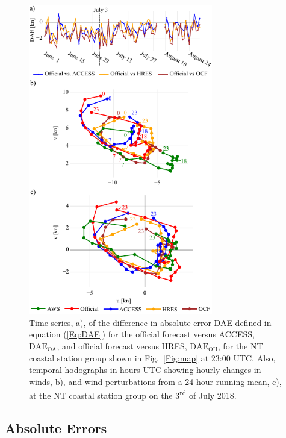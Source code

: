 \documentclass[twocol]{ametsoc}
\begin{document}
\begin{figure}
\centering
\includegraphics[width=19pc]{case_studies_nt.pdf}
\caption{Time series, a), of the difference in absolute error DAE defined in equation (\ref{Eq:DAE}) for the official forecast versus ACCESS, $\text{DAE}_\text{OA}$, and official forecast versus HRES, $\text{DAE}_\text{OH}$, for the NT coastal station group shown in Fig.~\ref{Fig:map} at 23:00 UTC. Also, temporal hodographs in hours UTC showing hourly changes in winds, b), and wind perturbations from a 24 hour running mean, c), at the NT coastal station group on the 3\textsuperscript{rd} of July 2018.}
\label{Fig:case_studies_nt}
\end{figure}

\subsection{Absolute Errors}
\label{Sec:Daily}
\end{document}
